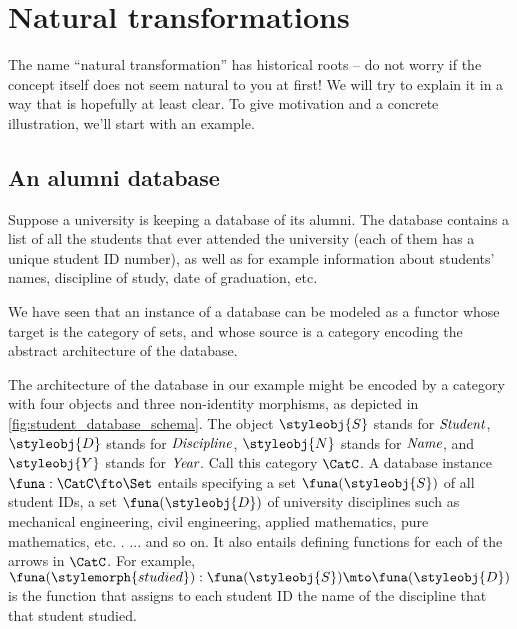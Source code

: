 
\section{Natural transformations}


The name ``natural transformation'' has historical roots -- do not worry if the concept itself does not seem natural to you at first!
We will try to explain it in a way that is hopefully at least clear.
To give motivation and a concrete illustration, we'll start with an example.


\subsection{An alumni database}

Suppose a university is keeping a database of its alumni.
The database contains a list of all the students that ever attended the university (each of them has a unique student ID number), as well as for example information about students' names, discipline of study, date of graduation, etc.

We have seen that an instance of a database can be modeled as a functor whose target is the category of sets, and whose source is a category encoding the abstract architecture of the database.

%
\begin{marginfigure}
    \centering
    \caption{}
    \label{fig:student_database_schema}
\end{marginfigure}
%

The architecture of the database in our example might be encoded by a category with four objects and three non-identity morphisms, as depicted in \cref{fig:student_database_schema}.
The object $\styleobj{S}$ stands for $\emph{Student}$, $\styleobj{D}$ stands for $\emph{Discipline}$, $\styleobj{N}$ stands for $\emph{Name}$, and $\styleobj{Y}$ stands for $\emph{Year}$.
Call this category $\CatC$.
A database instance $\funa : \CatC \fto \Set$ entails specifying a set $\funa(\styleobj{S})$ of all student IDs, a set $\funa(\styleobj{D})$ of university disciplines such as mechanical engineering, civil engineering, applied mathematics, pure mathematics, etc. .
... and so on.
It also entails defining functions for each of the arrows in $\CatC$.
For example, $\funa(\stylemorph{studied}) : \funa(\styleobj{S}) \mto \funa(\styleobj{D})$ is the function that assigns to each student ID the name of the discipline that that student studied.

